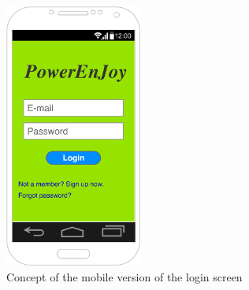 \begin{figure}[H]
\begin{center}
		\includegraphics[width=0.4\textwidth]{./specific_requirements/features/diagrams/mobile_login.png}
		\caption{Concept of the mobile version of the login screen}
\end{center}
\end{figure}